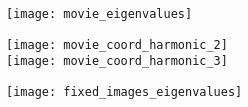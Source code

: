 \documentclass[12pt]{minimal}
\begin{document}
\hspace{-0.5cm}
\texttt{[image: movie\_eigenvalues]}
%
\begin{minipage}[b]{4cm}
\texttt{[image: movie\_coord\_harmonic\_2]}\\
\texttt{[image: movie\_coord\_harmonic\_3]}
\end{minipage}
%
\hfill
{}
\hspace{-0.5cm}
\texttt{[image: fixed\_images\_eigenvalues]}
\end{document}
